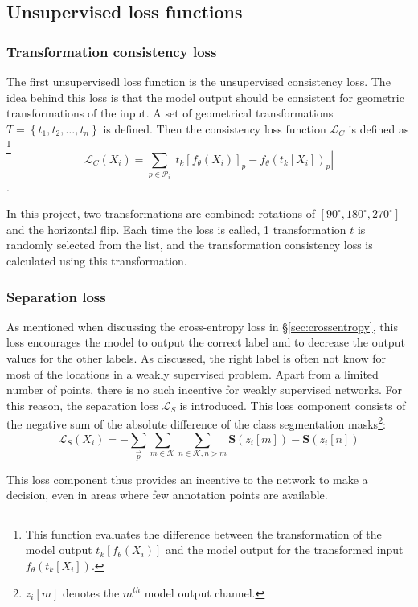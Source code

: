 

\subsection{Unsupervised loss functions}

\subsubsection{Transformation consistency loss}
The first \Gls{unsupervisedl} loss function is the unsupervised consistency loss\cite{Laradji2021}. 
The idea behind this loss is that the model output should be consistent for geometric transformations of the input.
A set of geometrical transformations $T=\left\{ t_1, t_2, \dots, t_n \right\}$ is defined. 
Then the consistency loss function $\mathcal{L}_C$ is defined as
\footnote{This function evaluates the difference between the transformation of the model output $t_k\left[f_\theta(X_i)\right]$ and the model output for the transformed input $f_\theta\left( t_k[X_i] \right)$.}
\begin{equation}
    \mathcal{L}_C(X_i) = \sum_{p \in \mathcal{P}_i} \left| t_k\left[f_\theta(X_i)\right]_p - f_\theta\left( t_k[X_i] \right)_p  \right|  
\end{equation}.

In this project, two transformations are combined: rotations of $[90^{\circ}, 180^{\circ}, 270^{\circ}]$ and the horizontal flip.
Each time the loss is called, 1 transformation $t$ is randomly selected from the list, and the transformation consistency loss is calculated using this transformation.

\subsubsection{Separation loss}
As mentioned when discussing the cross-entropy loss in §\ref{sec:crossentropy}, this loss encourages the model to output the correct label and to decrease the output values for the other labels.
As discussed, the right label is often not know for most of the locations in a weakly supervised problem.
Apart from a limited number of points, there is no such incentive for weakly supervised networks.
For this reason, the separation loss $\mathcal{L}_S$ is introduced.
This loss component consists of the negative sum of the absolute difference of the class segmentation masks\footnote{$z_i[m]$ denotes the $m^{th}$ model output channel.}:
\begin{equation}
    \mathcal{L}_S(X_i) = - \sum_{\vec{p}} \sum_{m\in \mathcal{K}} \sum_{n \in \mathcal{K}, n>m} \mathbf{S}(z_i[m]) - \mathbf{S}(z_i[n])
\end{equation}

This loss component thus provides an incentive to the network to make a decision, even in areas where few annotation points are available.